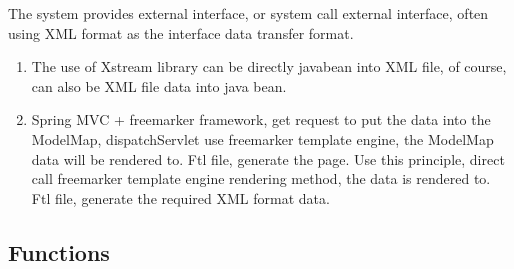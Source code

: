 The system provides external interface, or system call external interface, often using XML format as the interface data transfer format.

\begin{enumerate}
  \item The use of Xstream library can be directly javabean into XML file, of course, can also be XML file data into java bean.
  \item {
    Spring MVC + freemarker framework, get request to put the data into the ModelMap, dispatchServlet use freemarker template engine, the ModelMap data will be rendered to.
    Ftl file, generate the page.
    Use this principle, direct call freemarker template engine rendering method, the data is rendered to.
    Ftl file, generate the required XML format data.
  }
\end{enumerate}

\subsection{Functions}

